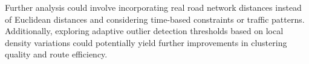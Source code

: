 Further analysis could involve incorporating real road network distances instead of Euclidean distances and considering time-based constraints or traffic patterns. Additionally, exploring adaptive outlier detection thresholds based on local density variations could potentially yield further improvements in clustering quality and route efficiency.




